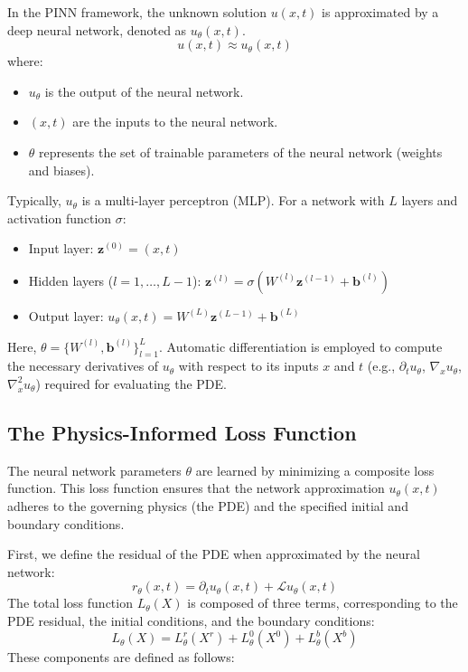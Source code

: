 \documentclass[11pt,twoside,openright]{report}
\begin{document}
In the PINN framework, the unknown solution $u(x, t)$ is approximated by a deep neural network, denoted as $u_{\theta}(x, t)$.
$$
u(x, t) \approx u_{\theta}(x, t)
$$
where:
\begin{itemize}
    \item $u_{\theta}$ is the output of the neural network.
    \item $(x, t)$ are the inputs to the neural network.
    \item $\theta$ represents the set of trainable parameters of the neural network (weights and biases).
\end{itemize}
Typically, $u_{\theta}$ is a multi-layer perceptron (MLP). For a network with $L$ layers and activation function $\sigma$:
\begin{itemize}
    \item Input layer: $\mathbf{z}^{(0)} = (x, t)$
    \item Hidden layers ($l=1, \dots, L-1$): $\mathbf{z}^{(l)} = \sigma(W^{(l)}\mathbf{z}^{(l-1)} + \mathbf{b}^{(l)})$
    \item Output layer: $u_{\theta}(x, t) = W^{(L)}\mathbf{z}^{(L-1)} + \mathbf{b}^{(L)}$
\end{itemize}
Here, $\theta = \{W^{(l)}, \mathbf{b}^{(l)}\}_{l=1}^L$. Automatic differentiation is employed to compute the necessary derivatives of $u_{\theta}$ with respect to its inputs $x$ and $t$ (e.g., $\partial_t u_{\theta}$, $\nabla_x u_{\theta}$, $\nabla_x^2 u_{\theta}$) required for evaluating the PDE.

\subsection{The Physics-Informed Loss Function}

The neural network parameters $\theta$ are learned by minimizing a composite loss function. This loss function ensures that the network approximation $u_{\theta}(x,t)$ adheres to the governing physics (the PDE) and the specified initial and boundary conditions. \cite{raissi2019physics}

First, we define the residual of the PDE when approximated by the neural network:
$$
r_{\theta}(x, t) = \partial_t u_{\theta}(x, t) + \mathcal{L}u_{\theta}(x, t)
$$
The total loss function $L_{\theta}(X)$ is composed of three terms, corresponding to the PDE residual, the initial conditions, and the boundary conditions:
$$
L_{\theta}(X) = L^{r}_{\theta}(X^r) + L^{0}_{\theta}(X^0) + L^{b}_{\theta}(X^b)
$$
These components are defined as follows:
\end{document}
